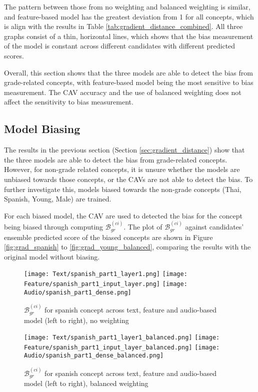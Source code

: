 The pattern between those from no weighting and balanced weighting is similar, and feature-based model has the greatest deviation from 1 for all concepts, which is align with the results in Table \ref{tab:gradient_distance_combined}. All three graphs consist of a thin, horizontal lines, which shows that the bias measurement of the model is constant across different candidates with different predicted scores.

Overall, this section shows that the three models are able to detect the bias from grade-related concepts, with feature-based model being the most sensitive to bias measurement. The CAV accuracy and the use of balanced weighting does not affect the sensitivity to bias measurement.

\subsection{Model Biasing} \label{sec:model_biasing}
The results in the previous section (Section \ref{sec:gradient_distance}) show that the three models are able to detect the bias from grade-related concepts. However, for non-grade related concepts, it is unsure whether the models are unbiased towards those concepts, or the CAVs are not able to detect the bias. To further investigate this, models biased towards the non-grade concepts (Thai, Spanish, Young, Male) are trained.

For each biased model, the CAV are used to detected the bias for the concept being biased through computing $\mathcal{B}^{(ci)}_{gr}$. The plot of $\mathcal{B}^{(ci)}_{gr}$ against candidates’ ensemble predicted score of the biased concepts are shown in Figure \ref{fig:grad_spanish} to \ref{fig:grad_young_balanced}, comparing the results with the original model without biasing.

\begin{figure}[H]
    \centering
    \begin{minipage}[t]{0.48\textwidth}
        \centering
        \texttt{[image: Text/spanish\_part1\_layer1.png]}
        \hfill
        \texttt{[image: Feature/spanish\_part1\_input\_layer.png]}
        \texttt{[image: Audio/spanish\_part1\_dense.png]}
        \caption{$\mathcal{B}^{(ci)}_{gr}$ for spanish concept across text, feature and audio-based model (left to right), no weighting}
        \label{fig:grad_spanish}
    \end{minipage}
    \hfill
    \begin{minipage}[t]{0.48\textwidth}
        \centering
        \texttt{[image: Text/spanish\_part1\_layer1\_balanced.png]}
        \hfill
        \texttt{[image: Feature/spanish\_part1\_input\_layer\_balanced.png]}
        \texttt{[image: Audio/spanish\_part1\_dense\_balanced.png]}
        \caption{$\mathcal{B}^{(ci)}_{gr}$ for spanish concept across text, feature and audio-based model (left to right), balanced weighting}
        \label{fig:grad_spanish_balanced}
    \end{minipage}
\end{figure}

